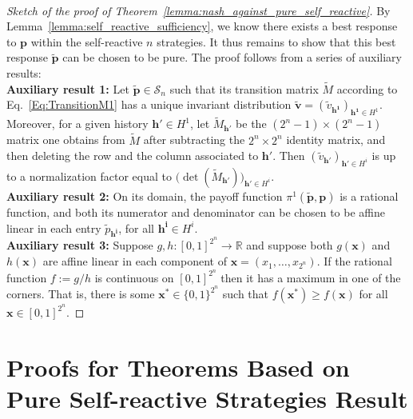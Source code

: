 \documentclass[11pt]{article}
\theoremstyle{plainCl1}
\theoremstyle{plainCl2}
\begin{document}
~

\noindent
\begin{proof}[Sketch of the proof of Theorem~\ref{lemma:nash_against_pure_self_reactive}]
By Lemma~\ref{lemma:self_reactive_sufficiency}, we know there exists a best response to $\mathbf{p}$ within the self-reactive $n$ strategies. It thus remains to show that this best response $\mathbf{\tilde p}$ can be chosen to be pure. 
The proof follows from a series of auxiliary results:\\

\noindent
{\bf Auxiliary result 1:}
Let $\mathbf{\tilde p}\!\in\!\mathcal{S}_n$ such that its transition matrix $\tilde M$ according to Eq.~\eqref{Eq:TransitionM1} has a unique invariant distribution $\mathbf{\tilde v} \!=\! (\tilde v_\mathbf{h^1})_{\mathbf{h^1}\in H^1}$. Moreover, for a given history $\mathbf{h'}\!\in\!H^1$, let $\tilde M_\mathbf{h'}$ be the $(2^n\!-\!1)\!\times\!(2^n\!-\!1)$ matrix one obtains from $\tilde M$ after subtracting the $2^n\!\times\!2^n$ identity matrix, and then deleting the row and the column associated to $\mathbf{h'}$. Then $(\tilde{v}_\mathbf{h'})_{\mathbf{h'}\in H^i}$ is up to a normalization factor equal to  $\big(\det(\tilde M_{\mathbf{h'}})\big)_{\mathbf{h'}\in H^i}$.\\

\noindent
{\bf Auxiliary result 2:}
On its domain, the payoff function $\pi^1(\mathbf{\tilde p},\mathbf{p})$ is a rational function, and both its numerator and denominator can be chosen to be affine linear in each entry $\tilde p_\mathbf{h^i} $, for all $\mathbf{h^i}\!\in\!H^i$.\\

\noindent
{\bf Auxiliary result 3:} Suppose $g,h:[0,1]^{2^n}\!\rightarrow\! \mathbb{R}$ and suppose both $g(\mathbf{x})$ and $h(\mathbf{x})$ are affine linear in each component of $\mathbf{x}=(x_1,\ldots,x_{2^n})$. If the rational function $f\!:=\!g/h$ is continuous on $[0,1]^{2^n}$ then it has a maximum in one of the corners. That is, there is some $\mathbf{x^*}\!\in\!\{0,1\}^{2^n}$ such that $f(\mathbf{x^*}) \ge f(\mathbf{x})$ for all $\mathbf{x}\!\in\![0,1]^{2^n}$.
\end{proof}



\section{Proofs for Theorems Based on Pure Self-reactive Strategies Result}\label{appendix:proofs_for_theorems_pure_self_reactive}
\end{document}
